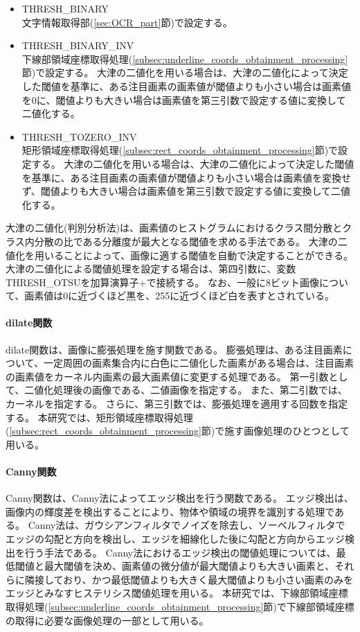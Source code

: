 \begin{itemize}
	\item THRESH\_BINARY\\
		文字情報取得部(\ref{sec:OCR_part}節)で設定する。
	\item THRESH\_BINARY\_INV\\
		下線部領域座標取得処理(\ref{subsec:underline_coords_obtainment_processing}節)で設定する。
		大津の二値化を用いる場合は、大津の二値化によって決定した閾値を基準に、ある注目画素の画素値が閾値よりも小さい場合は画素値を0に、閾値よりも大きい場合は画素値を第三引数で設定する値に変換して二値化する。
	\item THRESH\_TOZERO\_INV\\
		矩形領域座標取得処理(\ref{subsec:rect_coords_obtainment_processing}節)で設定する。
		大津の二値化を用いる場合は、大津の二値化によって決定した閾値を基準に、ある注目画素の画素値が閾値よりも小さい場合は画素値を変換せず、閾値よりも大きい場合は画素値を第三引数で設定する値に変換して二値化する。
\end{itemize}

大津の二値化(判別分析法)は、画素値のヒストグラムにおけるクラス間分散とクラス内分散の比である分離度が最大となる閾値を求める手法である\cite{大津の二値化}。
大津の二値化を用いることによって、画像に適する閾値を自動で決定することができる。
大津の二値化による閾値処理を設定する場合は、第四引数に、変数THRESH\_OTSUを加算演算子+で接続する。
なお、一般に8ビット画像について、画素値は0に近づくほど黒を、255に近づくほど白を表すとされている\cite{画素値}。

\paragraph{dilate関数}
dilate関数は、画像に膨張処理を施す関数である。
膨張処理は、ある注目画素について、一定周囲の画素集合内に白色に二値化した画素がある場合は、注目画素の画素値をカーネル内画素の最大画素値に変更する処理である\cite{膨張処理}。
第一引数として、二値化処理後の画像である、二値画像を指定する。
また、第二引数では、カーネルを指定する。
さらに、第三引数では、膨張処理を適用する回数を指定する。
本研究では、矩形領域座標取得処理(\ref{subsec:rect_coords_obtainment_processing}節)で施す画像処理のひとつとして用いる。

\paragraph{Canny関数}
Canny関数は、Canny法によってエッジ検出を行う関数である。
エッジ検出は、画像内の輝度差を検出することにより、物体や領域の境界を識別する処理である\cite{エッジ検出}。
Canny法は、ガウシアンフィルタでノイズを除去し、ソーベルフィルタでエッジの勾配と方向を検出し、エッジを細線化した後に勾配と方向からエッジ検出を行う手法である。
Canny法におけるエッジ検出の閾値処理については、最低閾値と最大閾値を決め、画素値の微分値が最大閾値よりも大きい画素と、それらに隣接しており、かつ最低閾値よりも大きく最大閾値よりも小さい画素のみをエッジとみなすヒステリシス閾値処理を用いる\cite{Canny法}。
本研究では、下線部領域座標取得処理(\ref{subsec:underline_coords_obtainment_processing}節)で下線部領域座標の取得に必要な画像処理の一部として用いる。

